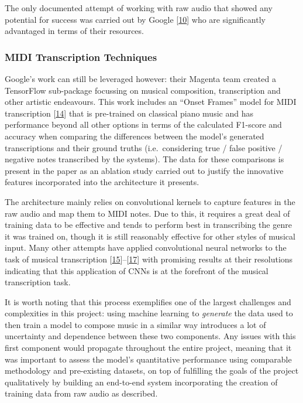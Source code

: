 \documentclass[12pt,]{article}
\begin{document}
The only documented attempt of working with raw audio that showed any
potential for success was carried out by Google
{[}\protect\hyperlink{ref-oord2016wavenet}{10}{]} who are significantly
advantaged in terms of their resources.

\hypertarget{midi-transcription-techniques}{%
\subsubsection{MIDI Transcription
Techniques}\label{midi-transcription-techniques}}

Google's work can still be leveraged however: their Magenta team created
a TensorFlow sub-package focussing on musical composition, transcription
and other artistic endeavours. This work includes an ``Onset Frames''
model for MIDI transcription
{[}\protect\hyperlink{ref-hawthorne2017onsets}{14}{]} that is
pre-trained on classical piano music and has performance beyond all
other options in terms of the calculated F1-score and accuracy when
comparing the differences between the model's generated transcriptions
and their ground truths (i.e.~considering true / false positive /
negative notes transcribed by the systems). The data for these
comparisons is present in the paper as an ablation study carried out to
justify the innovative features incorporated into the architecture it
presents.

The architecture mainly relies on convolutional kernels to capture
features in the raw audio and map them to MIDI notes. Due to this, it
requires a great deal of training data to be effective and tends to
perform best in transcribing the genre it was trained on, though it is
still reasonably effective for other styles of musical input. Many other
attempts have applied convolutional neural networks to the task of
musical transcription
{[}\protect\hyperlink{ref-bereketai}{15}{]}--{[}\protect\hyperlink{ref-sarnatskyi2017music}{17}{]}
with promising results at their resolutions indicating that this
application of CNNs is at the forefront of the musical transcription
task.

It is worth noting that this process exemplifies one of the largest
challenges and complexities in this project: using machine learning to
\emph{generate} the data used to then train a model to compose music in
a similar way introduces a lot of uncertainty and dependence between
these two components. Any issues with this first component would
propagate throughout the entire project, meaning that it was important
to assess the model's quantitative performance using comparable
methodology and pre-existing datasets, on top of fulfilling the goals of
the project qualitatively by building an end-to-end system incorporating
the creation of training data from raw audio as described.
\end{document}
